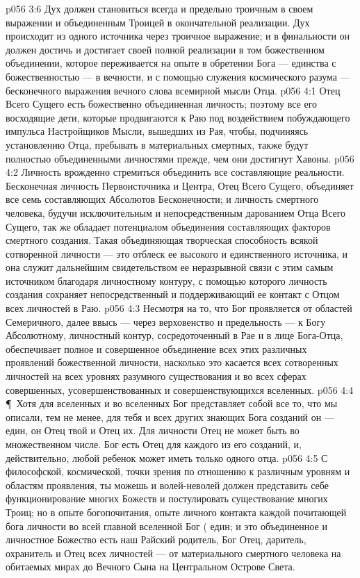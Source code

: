 \vs p056 3:6 Дух должен становиться всегда и предельно троичным в своем выражении и объединенным Троицей в окончательной реализации. Дух происходит из одного источника через троичное выражение; и в финальности он должен достичь и достигает своей полной реализации в том божественном объединении, которое переживается на опыте в обретении Бога --- единства с божественностью --- в вечности, и с помощью служения космического разума --- бесконечного выражения вечного слова всемирной мысли Отца.
\vs p056 4:1 Отец Всего Сущего есть божественно объединенная личность; поэтому все его восходящие дети, которые продвигаются к Раю под воздействием побуждающего импульса Настройщиков Мысли, вышедших из Рая, чтобы, подчиняясь установлению Отца, пребывать в материальных смертных, также будут полностью объединенными личностями прежде, чем они достигнут Хавоны.
\vs p056 4:2 Личность врожденно стремиться объединить все составляющие реальности. Бесконечная личность Первоисточника и Центра, Отец Всего Сущего, объединяет все семь составляющих Абсолютов Бесконечности; и личность смертного человека, будучи исключительным и непосредственным дарованием Отца Всего Сущего, так же обладает потенциалом объединения составляющих факторов смертного создания. Такая объединяющая творческая способность всякой сотворенной личности --- это отблеск ее высокого и единственного источника, и она служит дальнейшим свидетельством ее неразрывной связи с этим самым источником благодаря личностному контуру, с помощью которого личность создания сохраняет непосредственный и поддерживающий ее контакт с Отцом всех личностей в Раю.
\vs p056 4:3 Несмотря на то, что Бог проявляется от областей Семеричного, далее ввысь --- через верховенство и предельность --- к Богу Абсолютному, личностный контур, сосредоточенный в Рае и в лице Бога\hyp{}Отца, обеспечивает полное и совершенное объединение всех этих различных проявлений божественной личности, насколько это касается всех сотворенных личностей на всех уровнях разумного существования и во всех сферах совершенных, усовершенствованных и совершенствующихся вселенных.
\vs p056 4:4 \P\ Хотя для вселенных и во вселенных Бог представляет собой все то, что мы описали, тем не менее, для тебя и всех других знающих Бога созданий он --- един, он Отец твой и Отец их. Для личности Отец не может быть во множественном числе. Бог есть Отец для каждого из его созданий, и, действительно, любой ребенок может иметь только одного отца.
\vs p056 4:5 С философской, космической, точки зрения по отношению к различным уровням и областям проявления, ты можешь и волей\hyp{}неволей должен представить себе функционирование многих Божеств и постулировать существование многих Троиц; но в опыте богопочитания, опыте личного контакта каждой почитающей бога личности во всей главной вселенной Бог ( един; и это объединенное и личностное Божество есть наш Райский родитель, Бог Отец, даритель, охранитель и Отец всех личностей --- от материального смертного человека на обитаемых мирах до Вечного Сына на Центральном Острове Света.
